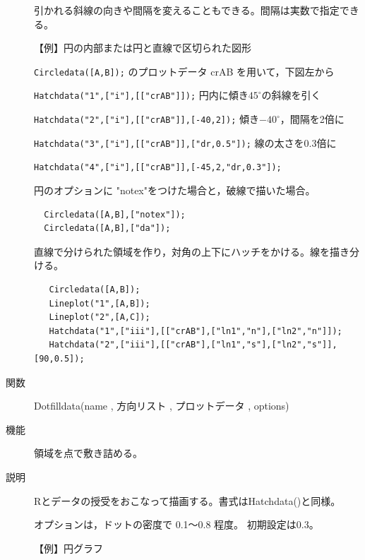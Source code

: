 \documentclass[papersize,a4paper,12pt,uplatex]{jsarticle}
\begin{document}
\begin{description}
\begin{center}   \end{center}

引かれる斜線の向きや間隔を変えることもできる。間隔は実数で指定できる。

\vspace{\baselineskip}
【例】円の内部または円と直線で区切られた図形

\verb|Circledata([A,B]);|  のプロットデータ crAB を用いて，下図左から

\verb|Hatchdata("1",["i"],[["crAB"]]);| 円内に傾き$45^{\circ}$の斜線を引く

\verb|Hatchdata("2",["i"],[["crAB"]],[-40,2]);| 傾き$-40^{\circ}$，間隔を2倍に

\verb|Hatchdata("3",["i"],[["crAB"]],["dr,0.5"]);|  線の太さを0.3倍に

\verb|Hatchdata("4",["i"],[["crAB"]],[-45,2,"dr,0.3"]);| 

  
 
円のオプションに "notex"をつけた場合と，破線で描いた場合。
\begin{verbatim}
  Circledata([A,B],["notex"]);
  Circledata([A,B],["da"]);
 \end{verbatim}

\hspace{10mm}    

直線で分けられた領域を作り，対角の上下にハッチをかける。線を描き分ける。
\begin{verbatim}
   Circledata([A,B]);
   Lineplot("1",[A,B]);
   Lineplot("2",[A,C]);
   Hatchdata("1",["iii"],[["crAB"],["ln1","n"],["ln2","n"]]);
   Hatchdata("2",["iii"],[["crAB"],["ln1","s"],["ln2","s"]],[90,0.5]);
\end{verbatim}

\hspace{20mm}   

\vspace{\baselineskip}
\hypertarget{dotfilldata}{}
\item[関数]  Dotfilldata(name , 方向リスト , プロットデータ , options)
\item[機能]  領域を点で敷き詰める。
\item[説明]  Rとデータの授受をおこなって描画する。書式はHatchdata()と同様。

オプションは，ドットの密度で 0.1〜0.8 程度。 初期設定は0.3。

\vspace{\baselineskip}
【例】円グラフ


\end{description}
\end{document}
